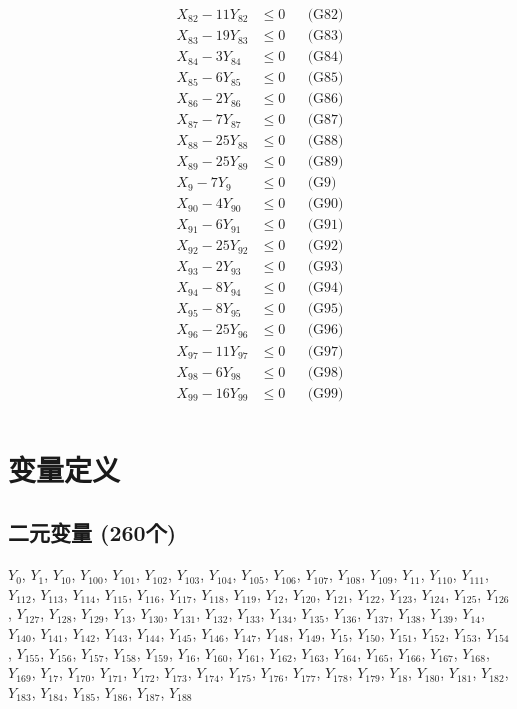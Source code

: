 \documentclass[a4paper,10pt]{article}
\begin{document}
{\begin{align}
X_{82} - 11Y_{82} &\leq 0 && \text{(G82)} \\
X_{83} - 19Y_{83} &\leq 0 && \text{(G83)} \\
X_{84} - 3Y_{84} &\leq 0 && \text{(G84)} \\
X_{85} - 6Y_{85} &\leq 0 && \text{(G85)} \\
X_{86} - 2Y_{86} &\leq 0 && \text{(G86)} \\
X_{87} - 7Y_{87} &\leq 0 && \text{(G87)} \\
X_{88} - 25Y_{88} &\leq 0 && \text{(G88)} \\
X_{89} - 25Y_{89} &\leq 0 && \text{(G89)} \\
X_{9} - 7Y_{9} &\leq 0 && \text{(G9)} \\
X_{90} - 4Y_{90} &\leq 0 && \text{(G90)} \\
X_{91} - 6Y_{91} &\leq 0 && \text{(G91)} \\
X_{92} - 25Y_{92} &\leq 0 && \text{(G92)} \\
X_{93} - 2Y_{93} &\leq 0 && \text{(G93)} \\
X_{94} - 8Y_{94} &\leq 0 && \text{(G94)} \\
X_{95} - 8Y_{95} &\leq 0 && \text{(G95)} \\
X_{96} - 25Y_{96} &\leq 0 && \text{(G96)} \\
X_{97} - 11Y_{97} &\leq 0 && \text{(G97)} \\
X_{98} - 6Y_{98} &\leq 0 && \text{(G98)} \\
X_{99} - 16Y_{99} &\leq 0 && \text{(G99)} \\
\allowbreak
\end{align}}

\section{变量定义}

\subsection{二元变量 (260个)}

{\small $Y_{0}$, $Y_{1}$, $Y_{10}$, $Y_{100}$, $Y_{101}$, $Y_{102}$, $Y_{103}$, $Y_{104}$, $Y_{105}$, $Y_{106}$, $Y_{107}$, $Y_{108}$, $Y_{109}$, $Y_{11}$, $Y_{110}$, $Y_{111}$, $Y_{112}$, $Y_{113}$, $Y_{114}$, $Y_{115}$, $Y_{116}$, $Y_{117}$, $Y_{118}$, $Y_{119}$, $Y_{12}$, $Y_{120}$, $Y_{121}$, $Y_{122}$, $Y_{123}$, $Y_{124}$, $Y_{125}$, $Y_{126}$, $Y_{127}$, $Y_{128}$, $Y_{129}$, $Y_{13}$, $Y_{130}$, $Y_{131}$, $Y_{132}$, $Y_{133}$, $Y_{134}$, $Y_{135}$, $Y_{136}$, $Y_{137}$, $Y_{138}$, $Y_{139}$, $Y_{14}$, $Y_{140}$, $Y_{141}$, $Y_{142}$, $Y_{143}$, $Y_{144}$, $Y_{145}$, $Y_{146}$, $Y_{147}$, $Y_{148}$, $Y_{149}$, $Y_{15}$, $Y_{150}$, $Y_{151}$, $Y_{152}$, $Y_{153}$, $Y_{154}$, $Y_{155}$, $Y_{156}$, $Y_{157}$, $Y_{158}$, $Y_{159}$, $Y_{16}$, $Y_{160}$, $Y_{161}$, $Y_{162}$, $Y_{163}$, $Y_{164}$, $Y_{165}$, $Y_{166}$, $Y_{167}$, $Y_{168}$, $Y_{169}$, $Y_{17}$, $Y_{170}$, $Y_{171}$, $Y_{172}$, $Y_{173}$, $Y_{174}$, $Y_{175}$, $Y_{176}$, $Y_{177}$, $Y_{178}$, $Y_{179}$, $Y_{18}$, $Y_{180}$, $Y_{181}$, $Y_{182}$, $Y_{183}$, $Y_{184}$, $Y_{185}$, $Y_{186}$, $Y_{187}$, $Y_{188}$}
\end{document}
